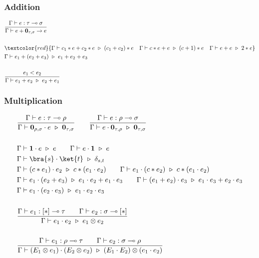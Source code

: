 \subsubsection*{Addition}
\begin{align*}
  &
  \frac{\Gamma \vdash e : \tau \multimap \sigma}{\Gamma \vdash e + \textbf{0}_{\tau, \sigma}\to e}\\
  &\ \\
  & 
  \textcolor{red}{\Gamma \vdash c_1 * e + c_2 * e \ \triangleright\ (c_1 + c_2) * e 
  \quad \Gamma \vdash c * e + e \ \triangleright\ (c + 1) * e
  \quad \Gamma \vdash e + e \ \triangleright\ 2 * e} \\
  & \Gamma \vdash e_1 + (e_2 + e_3) \ \triangleright\ e_1 + e_2 + e_3 \\
  &\ \\
  & \frac{e_1 < e_2}{\Gamma \vdash e_1 + e_2 \ \triangleright\ e_2 + e_1}
\end{align*}


\subsubsection*{Multiplication}
\begin{align*}
  & \frac{\Gamma \vdash e : \tau \multimap \rho}{\Gamma \vdash \textbf{0}_{\rho, \sigma} \cdot e \ \triangleright\ \textbf{0}_{\tau, \sigma}}
  \qquad 
  \frac{\Gamma \vdash e : \rho \multimap \sigma}{\Gamma \vdash e \cdot \textbf{0}_{\tau, \rho} \ \triangleright\ \textbf{0}_{\tau, \sigma}}\\
  &\ \\
  & \Gamma \vdash \mathbf{1} \cdot e \ \triangleright\ e
  \qquad
  \Gamma \vdash e \cdot \mathbf{1} \ \triangleright\ e \\
  & \Gamma \vdash \bra{s} \cdot \ket{t} \ \triangleright\ \delta_{s, t}\\
  & \Gamma \vdash (c * e_1) \cdot e_2 \ \triangleright\ c * (e_1 \cdot e_2)
  \qquad \Gamma \vdash e_1 \cdot (c * e_2) \ \triangleright\ c * (e_1 \cdot e_2) \\ 
  & \Gamma \vdash e_1 \cdot (e_2 + e_3) \ \triangleright\ e_1 \cdot e_2 + e_1 \cdot e_3
  \qquad \Gamma \vdash (e_1 + e_2) \cdot e_3 \ \triangleright\ e_1 \cdot e_3 + e_2 \cdot e_3 \\
  & \Gamma \vdash e_1 \cdot (e_2 \cdot e_3) \ \triangleright\ e_1 \cdot e_2 \cdot e_3\\
  &\ \\
  & \frac{\Gamma \vdash e_1 : [*] \multimap \tau\qquad \Gamma \vdash e_2 : \sigma \multimap [*]}{\Gamma \vdash e_1 \cdot e_2 \ \triangleright\ e_1 \otimes e_2}\\
  &\ \\
  & \frac{\Gamma \vdash e_1 : \rho \multimap \tau \qquad \Gamma \vdash e_2 : \sigma \multimap \rho}{\Gamma \vdash (E_1 \otimes e_1) \cdot (E_2 \otimes e_2) \ \triangleright\ (E_1 \cdot E_2) \otimes (e_1 \cdot e_2)}
\end{align*}

